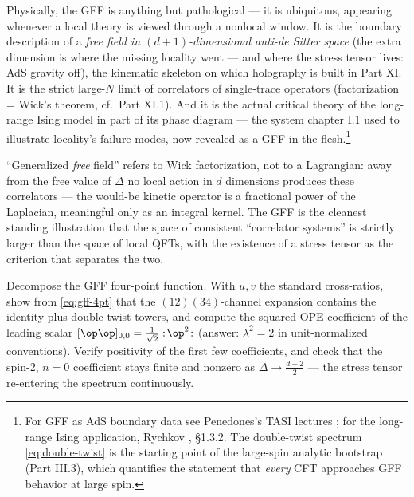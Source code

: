 Physically, the GFF is anything but pathological --- it is ubiquitous,
appearing whenever a local theory is viewed through a nonlocal window.
It is the boundary description of a \emph{free field in $(d+1)$-dimensional
anti-de Sitter space} (the extra dimension is where the missing locality
went --- and where the stress tensor lives: AdS gravity off), the kinematic
skeleton on which holography is built in Part XI. It is the strict large-$N$
limit of correlators of single-trace operators (factorization = Wick's
theorem, cf.\ Part XI.1). And it is the actual critical theory of the
long-range Ising model in part of its phase diagram --- the system chapter
I.1 used to illustrate locality's failure modes, now revealed as a GFF in
the flesh.\footnote{For GFF as AdS boundary data see Penedones's TASI
lectures ; for the long-range Ising application, Rychkov
, \S1.3.2. The double-twist spectrum
\eqref{eq:double-twist} is the starting point of the large-spin analytic
bootstrap (Part III.3), which quantifies the statement that \emph{every} CFT
approaches GFF behavior at large spin.}

\begin{nnote}
``Generalized \emph{free} field'' refers to Wick factorization, not to a
Lagrangian: away from the free value of $\Delta$ no local action in $d$
dimensions produces these correlators --- the would-be kinetic operator is a
fractional power of the Laplacian, meaningful only as an integral
kernel. The GFF is the cleanest standing illustration that the
space of consistent ``correlator systems'' is strictly larger than the space
of local QFTs, with the existence of a stress tensor as the criterion that
separates the two.
\end{nnote}

\begin{exercise}[classic]
\label{exr:gff-ope}
Decompose the GFF four-point function. With $u, v$ the standard cross-ratios,
show from \eqref{eq:gff-4pt} that the $(12)(34)$-channel expansion contains
the identity plus double-twist towers, and compute the squared OPE coefficient
of the leading scalar $[\op\op]_{0,0} = \tfrac{1}{\sqrt 2}:\!\op^2\!:$
(answer: $\lambda^2 = 2$ in unit-normalized conventions). Verify positivity
of the first few coefficients, and check that the spin-2, $n=0$ coefficient
stays finite and nonzero as $\Delta \to \frac{d-2}{2}$ --- the stress tensor
re-entering the spectrum continuously.
\end{exercise}

